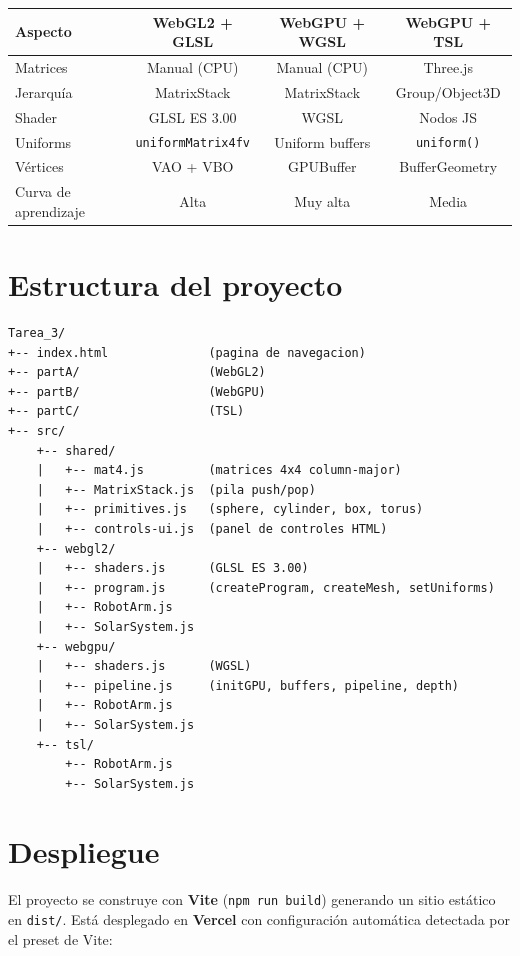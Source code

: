\documentclass[12pt,a4paper]{article}
\begin{document}
\begin{center}
\begin{tabular}{lccc}
  \toprule
  Aspecto & WebGL2 + GLSL & WebGPU + WGSL & WebGPU + TSL \\
  \midrule
  Matrices        & Manual (CPU) & Manual (CPU)  & Three.js     \\
  Jerarquía       & MatrixStack  & MatrixStack   & Group/Object3D \\
  Shader          & GLSL ES 3.00 & WGSL          & Nodos JS     \\
  Uniforms        & \texttt{uniformMatrix4fv} & Uniform buffers & \texttt{uniform()} \\
  Vértices        & VAO + VBO    & GPUBuffer     & BufferGeometry \\
  Curva de aprendizaje & Alta    & Muy alta      & Media        \\
  \bottomrule
\end{tabular}
\end{center}

\section{Estructura del proyecto}

\begin{verbatim}
Tarea_3/
+-- index.html              (pagina de navegacion)
+-- partA/                  (WebGL2)
+-- partB/                  (WebGPU)
+-- partC/                  (TSL)
+-- src/
    +-- shared/
    |   +-- mat4.js         (matrices 4x4 column-major)
    |   +-- MatrixStack.js  (pila push/pop)
    |   +-- primitives.js   (sphere, cylinder, box, torus)
    |   +-- controls-ui.js  (panel de controles HTML)
    +-- webgl2/
    |   +-- shaders.js      (GLSL ES 3.00)
    |   +-- program.js      (createProgram, createMesh, setUniforms)
    |   +-- RobotArm.js
    |   +-- SolarSystem.js
    +-- webgpu/
    |   +-- shaders.js      (WGSL)
    |   +-- pipeline.js     (initGPU, buffers, pipeline, depth)
    |   +-- RobotArm.js
    |   +-- SolarSystem.js
    +-- tsl/
        +-- RobotArm.js
        +-- SolarSystem.js
\end{verbatim}

\section{Despliegue}

El proyecto se construye con \textbf{Vite} (\texttt{npm run build}) generando un sitio estático en \texttt{dist/}. Está desplegado en \textbf{Vercel} con configuración automática detectada por el preset de Vite:
\end{document}
